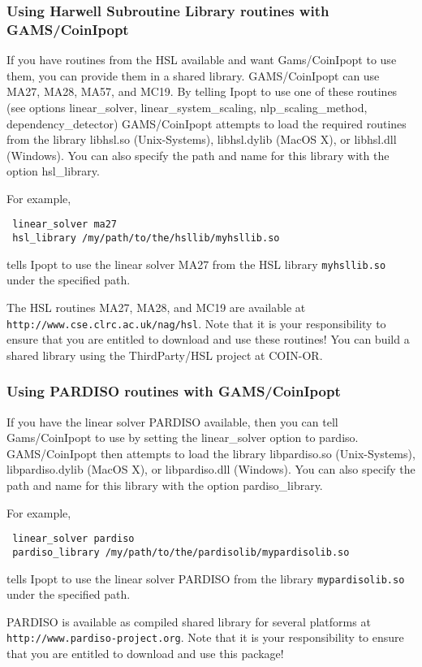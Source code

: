 \subsubsection{Using Harwell Subroutine Library routines with GAMS/CoinIpopt}

If you have routines from the HSL available and want Gams/CoinIpopt to use them, you can provide them in a shared library.
GAMS/CoinIpopt can use MA27, MA28, MA57, and MC19.
By telling Ipopt to use one of these routines (see options linear\_solver, linear\_system\_scaling, nlp\_scaling\_method, dependency\_detector) GAMS/CoinIpopt attempts to load the required routines from the library libhsl.so (Unix-Systems), libhsl.dylib (MacOS X), or libhsl.dll (Windows).
You can also specify the path and name for this library with the option hsl\_library.

For example,
\begin{verbatim}
 linear_solver ma27
 hsl_library /my/path/to/the/hsllib/myhsllib.so
\end{verbatim}
tells Ipopt to use the linear solver MA27 from the HSL library \verb=myhsllib.so= under the specified path.

The HSL routines MA27, MA28, and MC19 are available at \texttt{http://www.cse.clrc.ac.uk/nag/hsl}.
Note that it is your responsibility to ensure that you are entitled to download and use these routines!
You can build a shared library using the ThirdParty/HSL project at COIN-OR.

\subsubsection{Using PARDISO routines with GAMS/CoinIpopt}

If you have the linear solver PARDISO available, then you can tell Gams/CoinIpopt to use by setting the linear\_solver option to pardiso.
GAMS/CoinIpopt then attempts to load the library libpardiso.so (Unix-Systems), libpardiso.dylib (MacOS X), or libpardiso.dll (Windows).
You can also specify the path and name for this library with the option pardiso\_library.

For example,
\begin{verbatim}
 linear_solver pardiso
 pardiso_library /my/path/to/the/pardisolib/mypardisolib.so
\end{verbatim}
tells Ipopt to use the linear solver PARDISO from the library \verb=mypardisolib.so= under the specified path.

PARDISO is available as compiled shared library for several platforms at \texttt{http://www.pardiso-project.org}.
Note that it is your responsibility to ensure that you are entitled to download and use this package!

